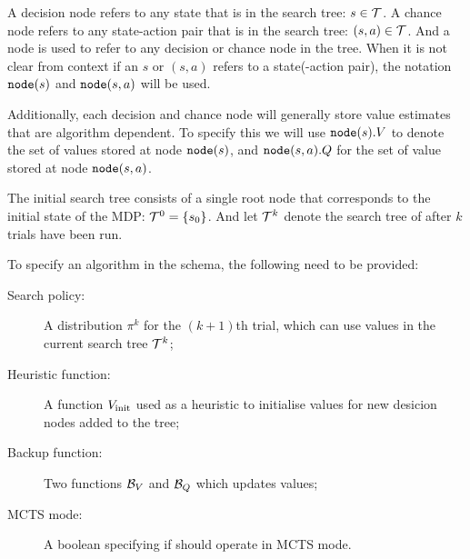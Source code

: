 


        \begin{defn}
            A \textnormal{decision node} refers to any state that is in the search tree: $s\in\mathcal{T}$. A \textnormal{chance node} refers to any state-action pair that is in the search tree: $(s,a)\in\mathcal{T}$. And a \textnormal{node} is used to refer to any decision or chance node in the tree. When it is not clear from context if an $s$ or $(s,a)$ refers to a state(-action pair), the notation ${\textnormal{\texttt{node}}}(s)$ and ${\textnormal{\texttt{node}}}(s,a)$ will be used. 
        \end{defn}

        Additionally, each decision and chance node will generally store value estimates that are algorithm dependent. To specify this we will use ${\textnormal{\texttt{node}}}(s).V$ to denote the set of values stored at node ${\textnormal{\texttt{node}}}(s)$, and ${\textnormal{\texttt{node}}}(s,a).Q$ for the set of value stored at node ${\textnormal{\texttt{node}}}(s,a)$. 


        The initial search tree consists of a single root node that corresponds to the initial state of the MDP: $\mathcal{T}^0=\{s_0\}$. And let $\mathcal{T}^k$ denote the search tree of \thtspp\ewe after $k$ trials have been run.

        To specify an algorithm in the \thtspp\ewe schema, the following need to be provided:
        \begin{description}
            \item[Search policy:]
                A distribution  $\pi^{k}$ for the $(k+1)$th trial, which can use values in the current search tree $\mathcal{T}^{k}$;
            \item[Heuristic function:]
                A function ${V_{\textnormal{init}}}$ used as a heuristic to initialise values for new desicion nodes added to the tree;
            \item[Backup function:]
                Two functions $\mathcal{B}_V$ and $\mathcal{B}_Q$ which updates values; 
            \item[MCTS mode:]
                A boolean \mctsmode specifying if \thtspp\ewe should operate in MCTS mode.
        \end{description}

